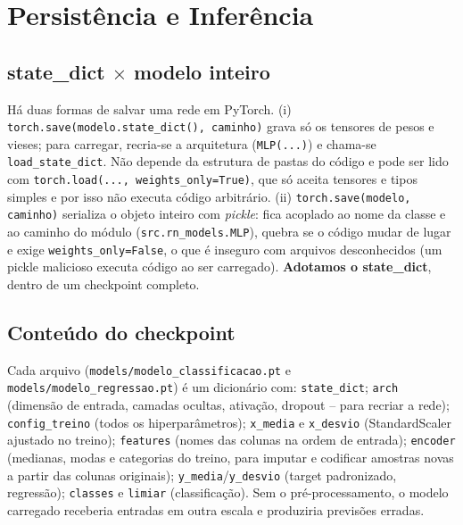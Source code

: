 \documentclass[11pt,a4paper]{article}
\begin{document}
\section{Persistência e Inferência}
\subsection{state\_dict $\times$ modelo inteiro}
Há duas formas de salvar uma rede em PyTorch. (i) \texttt{torch.save(modelo.state\_dict(), caminho)} grava só os tensores de pesos e
vieses; para carregar, recria-se a arquitetura (\texttt{MLP(...)}) e chama-se \texttt{load\_state\_dict}. Não depende da estrutura de
pastas do código e pode ser lido com \texttt{torch.load(..., weights\_only=True)}, que só aceita tensores e tipos simples e por isso
não executa código arbitrário. (ii) \texttt{torch.save(modelo, caminho)} serializa o objeto inteiro com \emph{pickle}: fica acoplado
ao nome da classe e ao caminho do módulo (\texttt{src.rn\_models.MLP}), quebra se o código mudar de lugar e exige
\texttt{weights\_only=False}, o que é inseguro com arquivos desconhecidos (um pickle malicioso executa código ao ser carregado).
\textbf{Adotamos o state\_dict}, dentro de um checkpoint completo.
\begin{table}[H]\centering\scriptsize{}
\caption{Tamanho em disco e relação com o número de parâmetros (float32). O overhead do checkpoint inclui média/desvio do scaler, nomes das features, codificação das categóricas e metadados do formato.}\label{tab:tam}\end{table}
\subsection{Conteúdo do checkpoint}
Cada arquivo (\texttt{models/modelo\_classificacao.pt} e \texttt{models/modelo\_regressao.pt}) é um dicionário com:
\texttt{state\_dict}; \texttt{arch} (dimensão de entrada, camadas ocultas, ativação, dropout -- para recriar a rede);
\texttt{config\_treino} (todos os hiperparâmetros); \texttt{x\_media} e \texttt{x\_desvio} (StandardScaler ajustado no treino);
\texttt{features} (nomes das colunas na ordem de entrada); \texttt{encoder} (medianas, modas e categorias do treino, para imputar e
codificar amostras novas a partir das colunas originais); \texttt{y\_media}/\texttt{y\_desvio} (target padronizado, regressão);
\texttt{classes} e \texttt{limiar} (classificação). Sem o pré-processamento, o modelo carregado receberia entradas em outra escala e
produziria previsões erradas.
\end{document}
